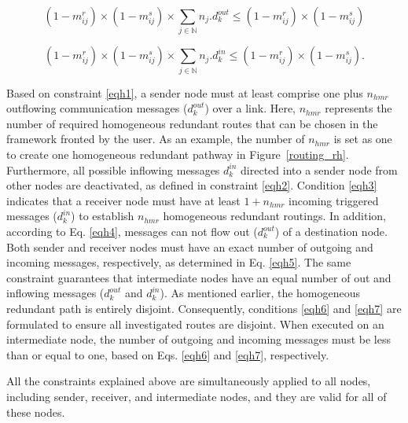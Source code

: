     
	\begin{equation}
		  (1 - m_{ij}^{r}) \times (1 - m_{ij}^{s}) \times \sum_{j \in \mathbb{N} } n_{j}.d_{k}^{out} \leq (1 - m_{ij}^{r}) \times (1 - m_{ij}^{s})
		\label{eqh6} 
	\end{equation}
	
		\begin{equation}
		  (1 - m_{ij}^{r}) \times (1 - m_{ij}^{s}) \times \sum_{j \in \mathbb{N} } n_{j}.d_{k}^{in} \leq (1 - m_{ij}^{r}) \times (1 - m_{ij}^{s}).
		\label{eqh7} 
	\end{equation}
    
     Based on constraint \eqref{eqh1}, a sender node must at least comprise one plus $n_{hmr}$ outflowing communication messages ($d_k^{out}$) over a link. Here, $n_{hmr}$ represents the number of required homogeneous redundant routes that can be chosen in the framework fronted by the user. As an example, the number of $n_{hmr}$ is set as one to create one homogeneous redundant pathway in Figure~\ref{routing_rh}.
     Furthermore, all possible inflowing messages $d_k^{in}$ directed into a sender node from other nodes are deactivated, as defined in constraint \eqref{eqh2}. Condition \eqref{eqh3} indicates that 
    a receiver node must have at least $1 + n_{hmr}$ incoming triggered messages ($d_k^{in}$) to establish $n_{hmr}$ homogeneous redundant routings. In addition, according to Eq. \eqref{eqh4}, messages can not flow out ($d_k^{out}$) of a destination node. Both sender and receiver nodes must have an exact number of outgoing and incoming messages, respectively, as determined in Eq. \eqref{eqh5}. The same constraint guarantees that intermediate nodes have an equal number of out and inflowing messages ($d_k^{out}$ and $d_k^{in}$). As mentioned earlier, the homogeneous redundant path is entirely disjoint. Consequently, conditions \eqref{eqh6} and \eqref{eqh7} are formulated to ensure all investigated routes are disjoint. When executed on an intermediate node, the number of outgoing and incoming messages must be less than or equal to one, based on Eqs. \eqref{eqh6} and \eqref{eqh7}, respectively.  
    
    
       
    All the constraints explained above are simultaneously applied to all nodes, including sender, receiver, and intermediate nodes, and they are valid for all of these nodes.    
    
